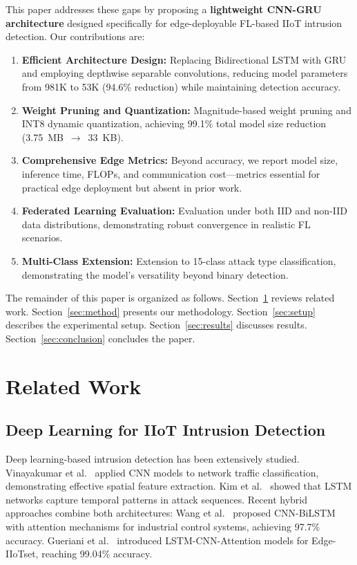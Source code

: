 \documentclass[preprint,12pt]{elsarticle}
\begin{document}
This paper addresses these gaps by proposing a \textbf{lightweight CNN-GRU architecture} designed specifically for edge-deployable FL-based IIoT intrusion detection. Our contributions are:
\begin{enumerate}
    \item \textbf{Efficient Architecture Design:} Replacing Bidirectional LSTM with GRU and employing depthwise separable convolutions, reducing model parameters from 981K to 53K (94.6\% reduction) while maintaining detection accuracy.
    \item \textbf{Weight Pruning and Quantization:} Magnitude-based weight pruning and INT8 dynamic quantization, achieving 99.1\% total model size reduction (3.75~MB~$\rightarrow$~33~KB).
    \item \textbf{Comprehensive Edge Metrics:} Beyond accuracy, we report model size, inference time, FLOPs, and communication cost---metrics essential for practical edge deployment but absent in prior work.
    \item \textbf{Federated Learning Evaluation:} Evaluation under both IID and non-IID data distributions, demonstrating robust convergence in realistic FL scenarios.
    \item \textbf{Multi-Class Extension:} Extension to 15-class attack type classification, demonstrating the model's versatility beyond binary detection.
\end{enumerate}

The remainder of this paper is organized as follows. Section~\ref{sec:related} reviews related work. Section~\ref{sec:method} presents our methodology. Section~\ref{sec:setup} describes the experimental setup. Section~\ref{sec:results} discusses results. Section~\ref{sec:conclusion} concludes the paper.

\section{Related Work}
\label{sec:related}

\subsection{Deep Learning for IIoT Intrusion Detection}

Deep learning-based intrusion detection has been extensively studied. Vinayakumar et al.~\cite{vinayakumar2017cnn} applied CNN models to network traffic classification, demonstrating effective spatial feature extraction. Kim et al.~\cite{kim2019deep} showed that LSTM networks capture temporal patterns in attack sequences. Recent hybrid approaches combine both architectures: Wang et al.~\cite{wang2024industrial} proposed CNN-BiLSTM with attention mechanisms for industrial control systems, achieving 97.7\% accuracy. Gueriani et al.~\cite{gueriani2025adaptive} introduced LSTM-CNN-Attention models for Edge-IIoTset, reaching 99.04\% accuracy.
\end{document}
